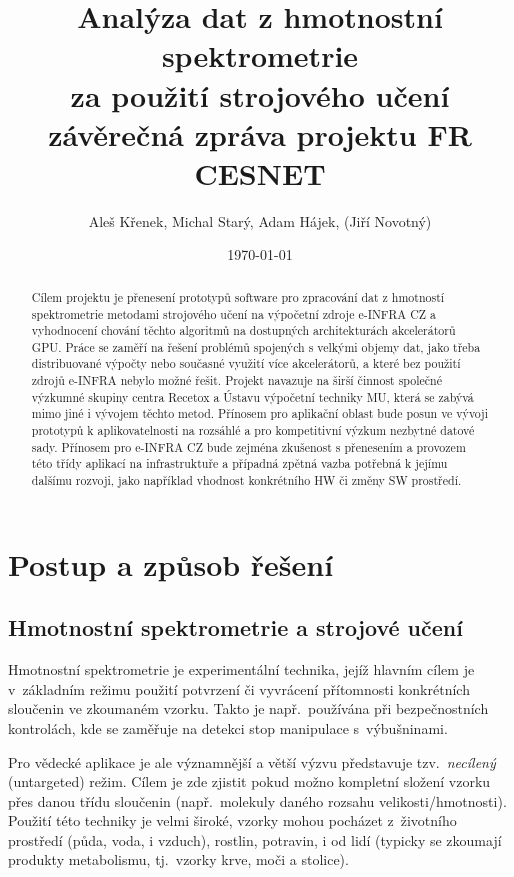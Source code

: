 \documentclass[a4paper,11pt]{article}
\title{Analýza dat z hmotnostní spektrometrie \\ za použití strojového učení \\[\medskipamount] 
\normalsize
závěrečná zpráva projektu FR CESNET}
\author{Aleš Křenek, Michal Starý, Adam Hájek, (Jiří Novotný)}
\date{\today}
\begin{document}
\maketitle

\begin{abstract}

Cílem projektu je přenesení prototypů software pro zpracování dat z hmotností
spektrometrie metodami strojového učení na výpočetní zdroje e-INFRA CZ a
vyhodnocení chování těchto algoritmů na dostupných architekturách akcelerátorů
GPU. Práce se zaměří na řešení problémů spojených s velkými objemy dat, jako
třeba distribuované výpočty nebo současné využití více akcelerátorů, a které
bez použití zdrojů e-INFRA nebylo možné řešit. Projekt navazuje na širší
činnost společné výzkumné skupiny centra Recetox a Ústavu výpočetní techniky MU,
která se zabývá mimo jiné i vývojem těchto metod. Přínosem pro aplikační oblast
bude posun ve vývoji prototypů k aplikovatelnosti na rozsáhlé a pro
kompetitivní výzkum nezbytné datové sady. Přínosem pro e-INFRA CZ bude zejména
zkušenost s přenesením a provozem této třídy aplikací na infrastruktuře a
případná zpětná vazba potřebná k jejímu dalšímu rozvoji, jako například
vhodnost konkrétního HW či změny SW prostředí.

\end{abstract}

\section{Postup a způsob řešení}

\subsection{Hmotnostní spektrometrie a strojové učení}

Hmotnostní spektrometrie je experimentální technika, jejíž hlavním cílem je v~základním 
režimu použití potvrzení či vyvrácení přítomnosti konkrétních sloučenin ve zkoumaném vzorku.
Takto je např.\ používána při bezpečnostních kontrolách, kde se zaměřuje na detekci stop manipulace s~výbušninami.

Pro vědecké aplikace je ale významnější a větší výzvu představuje tzv.\ \emph{necílený} (untargeted) režim.
Cílem je zde zjistit pokud možno kompletní složení vzorku přes danou třídu sloučenin (např.\ molekuly daného rozsahu velikosti/hmotnosti).
Použití této techniky je velmi široké, vzorky mohou pocházet z~životního prostředí (půda, voda, i vzduch),
rostlin, potravin, i od lidí (typicky se zkoumají produkty metabolismu, tj.\ vzorky krve, moči a stolice).
\end{document}

